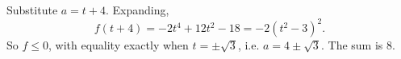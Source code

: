 Substitute $a=t+4$. Expanding,
\[f(t+4)=-2t^4+12t^2-18=-2\left(t^2-3\right)^2.\]
So $f\le0$, with equality exactly when $t=\pm\sqrt3$, i.e. $a=4\pm\sqrt3$. The sum is $\boxed{8}$.
